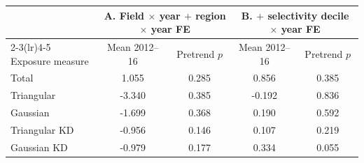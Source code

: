 \begin{tabular}{lcccc}
\toprule
 & \multicolumn{2}{c}{A. Field \(\times\) year \(+\) region \(\times\) year FE} & \multicolumn{2}{c}{B. \(+\) selectivity decile \(\times\) year FE} \\
\cmidrule(lr){2-3}\cmidrule(lr){4-5}
Exposure measure & Mean 2012--16 & Pretrend \(p\) & Mean 2012--16 & Pretrend \(p\) \\
\midrule
Total &  1.055 & 0.285 &  0.856 & 0.385 \\
Triangular & -3.340 & 0.385 & -0.192 & 0.836 \\
Gaussian & -1.699 & 0.368 &  0.190 & 0.592 \\
Triangular KD & -0.956 & 0.146 &  0.107 & 0.219 \\
Gaussian KD & -0.979 & 0.177 &  0.334 & 0.055 \\
\bottomrule
\end{tabular}
